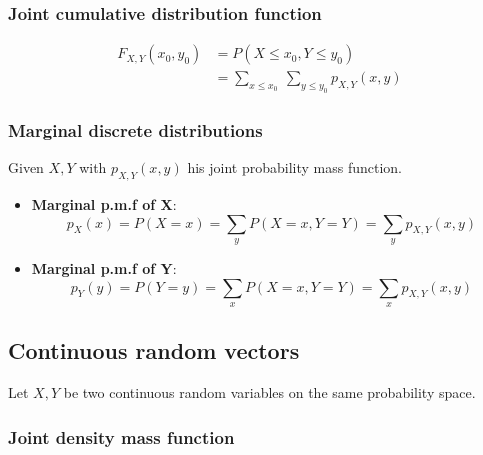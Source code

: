 \subsubsection{Joint cumulative distribution function} %
\label{ssub:joint_cumulative_distribution_function}

\begin{equation*}
    \begin{split}
        F_{X,Y}(x_0,y_0)& =P(X\leq x_0,Y\leq y_0)\\
                        &= \sum_{x\leq x_0}\:\sum_{y\leq y_0}p_{X,Y}(x,y)
    \end{split}
\end{equation*}

\subsubsection{Marginal discrete distributions} %
\label{ssub:marginal_discrete_distributions}

Given $X, Y$ with $p_{X,Y}(x,y)$ his joint probability mass function.
\begin{itemize}
    \item \textbf{Marginal p.m.f of X}:
    \begin{equation*}
        p_X(x)=P(X=x)=\sum_yP(X=x,Y=Y)=\sum_yp_{X,Y}(x,y)
    \end{equation*}
    \item \textbf{Marginal p.m.f of Y}:
    \begin{equation*}
        p_Y(y)=P(Y=y)=\sum_xP(X=x,Y=Y)=\sum_xp_{X,Y}(x,y)
    \end{equation*}
\end{itemize}

\subsection{Continuous random vectors} %
\label{sub:continuous_random_vectors}

Let $X, Y$ be two continuous random variables on the same probability space.

\subsubsection{Joint density mass function} %
\label{ssub:joint_density_mass_function}

